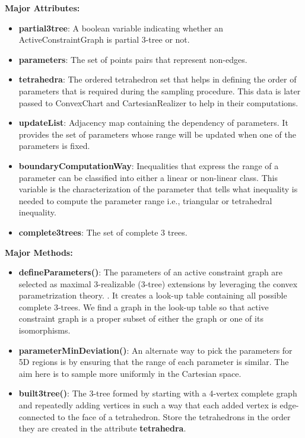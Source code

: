 \noindent \textbf{Major Attributes:} 
\begin{itemize}
		\item  \textbf{partial3tree}: A boolean variable indicating whether
				an ActiveConstraintGraph is partial 3-tree or not.
		\item  \textbf{parameters}: The set of points pairs that represent
				non-edges. 
		\item  \textbf{tetrahedra}: The ordered tetrahedron set that helps in 
				defining the order of parameters that is required
				during the sampling procedure. This data is later passed to
				ConvexChart and CartesianRealizer to help in their computations. 
		\item  \textbf{updateList}: Adjacency map containing the dependency of
				parameters. It provides the set of parameters whose range will
				be updated when one of the parameters is fixed.
		\item  \textbf{boundaryComputationWay}: Inequalities that express the
				range of a parameter can be classified into either a linear or
				non-linear class. This variable is the characterization of the
				parameter that tells what inequality is needed to compute
				the parameter range i.e., triangular or tetrahedral inequality. 
		\item  \textbf{complete3trees}: The set of complete 3 trees.
\end{itemize}

\noindent \textbf{Major Methods:}
\begin{itemize}
		\item  \textbf{defineParameters()}: The parameters of an active
				constraint graph are selected as maximal 3-realizable (3-tree)
				extensions by leveraging the convex parametrization theory.
				\cite{SiGa:2010}. It creates a look-up table containing all possible 
				complete 3-trees. We find a graph in the look-up
				table so that active constraint graph is a proper subset of either the 
				graph or one of its isomorphisms.
		\item  \textbf{parameterMinDeviation()}: An alternate way to pick
				the parameters for 5D regions is by ensuring that the range
				of each parameter is similar. The aim here is to sample more
				uniformly in the Cartesian space. 
		\item  \textbf{built3tree()}: The 3-tree formed by starting with a
				4-vertex complete graph and repeatedly adding vertices in
				such a way that each added vertex is edge-connected to the face
				of a tetrahedron. Store the tetrahedrons in the order they are
				created in the attribute \textbf{tetrahedra}.
\end{itemize}


